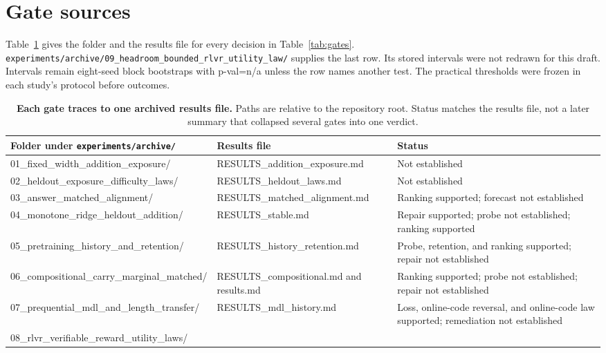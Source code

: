 \section{Gate sources}
\label{app:gates}

Table~\ref{tab:gate-sources} gives the folder and the results file for every decision in Table~\ref{tab:gates}.
\texttt{experiments/archive/09\_headroom\_bounded\_rlvr\_utility\_law/} supplies the last row.
Its stored intervals were not redrawn for this draft.
Intervals remain eight-seed block bootstraps with p-val=n/a unless the row names another test.
The practical thresholds were frozen in each study's protocol before outcomes.

\begin{table}[h]
\centering
\scriptsize
\caption{\textbf{Each gate traces to one archived results file.} Paths are relative to the repository root.
Status matches the results file, not a later summary that collapsed several gates into one verdict.}
\label{tab:gate-sources}
\begin{tabular}{@{}p{}p{}p{}@{}}
\toprule
Folder under \texttt{experiments/archive/} & Results file & Status \\
\midrule
01\_fixed\_width\_\allowbreak addition\_exposure/ &
RESULTS\_addition\_exposure.md &
Not established \\
02\_heldout\_exposure\_\allowbreak difficulty\_laws/ &
RESULTS\_heldout\_laws.md &
Not established \\
03\_answer\_matched\_\allowbreak alignment/ &
RESULTS\_matched\_alignment.md &
Ranking supported; forecast not established \\
04\_monotone\_ridge\_\allowbreak heldout\_addition/ &
RESULTS\_stable.md &
Repair supported; probe not established; ranking supported \\
05\_pretraining\_history\_\allowbreak and\_retention/ &
RESULTS\_history\_retention.md &
Probe, retention, and ranking supported; repair not established \\
06\_compositional\_carry\_\allowbreak marginal\_matched/ &
RESULTS\_compositional.md and results.md &
Ranking supported; probe not established; repair not established \\
07\_prequential\_mdl\_\allowbreak and\_length\_transfer/ &
RESULTS\_mdl\_history.md &
Loss, online-code reversal, and online-code law supported; remediation not established \\
08\_rlvr\_verifiable\_\allowbreak reward\_utility\_laws/ &

\end{tabular}
\end{table}

